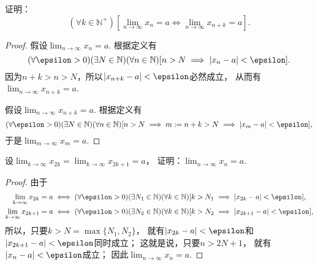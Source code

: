 \begin{example}\label{example:极限.指标变化时数列极限不变}
证明：\[
	(\forall k\in\mathbb{N}^+)
	\left[ \lim_{n\to\infty} x_n = a \iff \lim_{n\to\infty} x_{n+k} = a \right].
\]
\begin{proof}
假设\(\lim_{n\to\infty} x_n = a\).
根据定义有\[
	(\forall\epsilon>0)
	(\exists N\in\mathbb{N})
	(\forall n\in\mathbb{N})
	[
		n>N
		\implies
		\abs{x_n-a}<\epsilon
	].
\]
因为\(n+k>n>N\)，所以\(\abs{x_{n+k}-a}<\epsilon\)必然成立，
从而有\(\lim_{n\to\infty} x_{n+k} = a\).

假设\(\lim_{n\to\infty} x_{n+k} = a\).
根据定义有\[
	(\forall\epsilon>0)
	(\exists N\in\mathbb{N})
	(\forall n\in\mathbb{N})
	[
		n>N
		\implies
		m \defeq n+k > N
		\implies
		\abs{x_m-a}<\epsilon
	],
\]
于是\(\lim_{m\to\infty} x_m = a\).
\end{proof}
\end{example}

\begin{example}\label{example:数列极限.奇偶子列收敛则数列收敛}
设\(\lim_{k\to\infty} x_{2k} = \lim_{k\to\infty} x_{2k+1} = a\)，
证明：\(\lim_{n\to\infty} x_n = a\).
\begin{proof}
由于\begin{gather*}
	\lim_{k\to\infty} x_{2k} = a
	\iff
	(\forall\epsilon>0)
	(\exists N_1\in\mathbb{N})
	(\forall k\in\mathbb{N})
	[
		k>N_1
		\implies
		\abs{x_{2k}-a}<\epsilon
	], \\
	\lim_{k\to\infty} x_{2k+1} = a
	\iff
	(\forall\epsilon>0)
	(\exists N_2\in\mathbb{N})
	(\forall k\in\mathbb{N})
	[
		k>N_2
		\implies
		\abs{x_{2k+1}-a}<\epsilon
	],
\end{gather*}
所以，只要\(k>N=\max\{N_1,N_2\}\)，
就有\(\abs{x_{2k}-a}<\epsilon\)和\(\abs{x_{2k+1}-a}<\epsilon\)同时成立；
这就是说，只要\(n>2N+1\)，
就有\(\abs{x_n-a}<\epsilon\)成立；
因此\(\lim_{n\to\infty} x_n = a\).
\end{proof}
\end{example}
